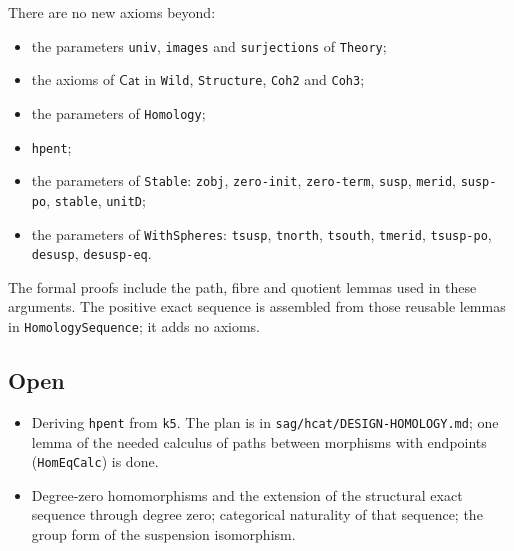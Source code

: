 \documentclass[11pt]{amsart}
\numberwithin{equation}{section}
\theoremstyle{definition}
\theoremstyle{remark}
\newcommand{\code}[1]{\texttt{#1}}
\newcommand{\Cat}{\mathsf{Cat}}
\begin{document}
There are no new axioms beyond:
\begin{itemize}
\item the parameters \code{univ}, \code{images} and \code{surjections} of
  \code{Theory};
\item the axioms of $\Cat$ in \code{Wild}, \code{Structure}, \code{Coh2} and
  \code{Coh3};
\item the parameters of \code{Homology};
\item \code{hpent};
\item the parameters of \code{Stable}: \code{zobj}, \code{zero-init},
  \code{zero-term}, \code{susp}, \code{merid}, \code{susp-po}, \code{stable},
  \code{unitD};
\item the parameters of \code{WithSpheres}: \code{tsusp}, \code{tnorth},
  \code{tsouth}, \code{tmerid}, \code{tsusp-po}, \code{desusp},
  \code{desusp-eq}.
\end{itemize}

\noindent The formal proofs include the path, fibre and quotient lemmas
used in these arguments. The positive exact sequence is assembled from
those reusable lemmas in \code{HomologySequence}; it adds no axioms.

\subsection*{Open}
\begin{itemize}
\item Deriving \code{hpent} from \code{k5}. The plan is in
  \code{sag/hcat/DESIGN-HOMOLOGY.md}; one lemma of the needed calculus of
  paths between morphisms with endpoints (\code{HomEqCalc}) is done.
\item Degree-zero homomorphisms and the extension of the structural
  exact sequence through degree zero; categorical naturality of that
  sequence; the group form of the suspension isomorphism.
\end{itemize}
\end{document}
